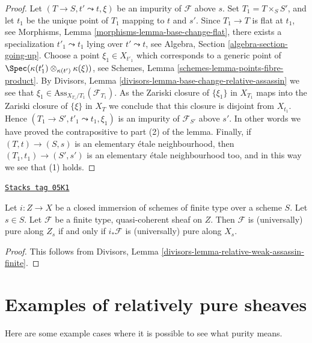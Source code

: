 \begin{proof}
Let $(T \to S, t' \leadsto t, \xi)$ be an impurity of
$\mathcal{F}$ above $s$. Set $T_1 = T \times_S S'$, and let $t_1$
be the unique point of $T_1$ mapping to $t$ and $s'$. Since
$T_1 \to T$ is flat at $t_1$, see
Morphisms, Lemma \ref{morphisms-lemma-base-change-flat},
there exists a specialization $t'_1 \leadsto t_1$ lying over
$t' \leadsto t$, see
Algebra, Section \ref{algebra-section-going-up}.
Choose a point $\xi_1 \in X_{t'_1}$ which corresponds to a generic
point of $\Spec(\kappa(t'_1) \otimes_{\kappa(t')} \kappa(\xi))$, see
Schemes, Lemma \ref{schemes-lemma-points-fibre-product}.
By
Divisors, Lemma \ref{divisors-lemma-base-change-relative-assassin}
we see that $\xi_1 \in \text{Ass}_{X_{T_1}/T_1}(\mathcal{F}_{T_1})$.
As the Zariski closure of $\{\xi_1\}$ in $X_{T_1}$ maps into the
Zariski closure of $\{\xi\}$ in $X_T$ we conclude that
this closure is disjoint from $X_{t_1}$. Hence
$(T_1 \to S', t'_1 \leadsto t_1, \xi_1)$
is an impurity of $\mathcal{F}_{S'}$ above $s'$.
In other words we have proved the contrapositive to part (2) of the
lemma. Finally, if $(T, t) \to (S, s)$ is an elementary
\'etale neighbourhood, then $(T_1, t_1) \to (S', s')$ is an
elementary \'etale neighbourhood too, and in this way we see that (1) holds.
\end{proof}

\begin{lemma}
\label{flat-lemma-supported-on-closed}
\href{https://stacks.math.columbia.edu/tag/05K1}{\texttt{Stacks tag 05K1}}

Let $i : Z \to X$ be a closed immersion of schemes of finite type over
a scheme $S$. Let $s \in S$. Let $\mathcal{F}$ be a
finite type, quasi-coherent sheaf on $Z$. Then $\mathcal{F}$ is
(universally) pure along $Z_s$ if and only if $i_*\mathcal{F}$
is (universally) pure along $X_s$.
\end{lemma}

\begin{proof}
This follows from
Divisors, Lemma \ref{divisors-lemma-relative-weak-assassin-finite}.
\end{proof}

\section{Examples of relatively pure sheaves}
\label{flat-section-examples-pure-sheaves}
Here are some example cases where it is possible to see what purity means.

